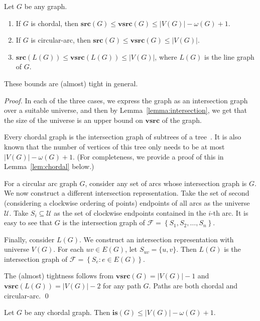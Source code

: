 \documentclass[letter,runningheads,envcountsame,envcountsect]{llncs}
\newcommand{\U}{\mathcal{U}}
\newcommand{\F}{\mathcal{F}}
\newcommand{\vsrc}{\mathbf{vsrc}}
\newcommand{\src}{\mathbf{src}}
\newcommand{\isn}{\mathbf{is}}
\begin{document}
\begin{corollary}
	\label{cor:chordal}
Let $G$ be any graph.
\begin{enumerate}
\item If $G$ is chordal, then $\src(G) \leq \vsrc(G) \leq |V(G)| - \omega(G) + 1$.
\item If $G$ is circular-arc, then $\src(G) \leq \vsrc(G) \leq |V(G)|$.
\item $\src(L(G)) \leq \vsrc(L(G)) \leq |V(G)|$, where $L(G)$ is the line graph of $G$.
\end{enumerate}
These bounds are (almost) tight in general.
\end{corollary}
\begin{proof}
	In each of the three cases, we express the graph as an intersection graph over a suitable universe, and then by Lemma~\ref{lemma:intersection}, we get that the size of the universe is an upper bound on $\vsrc$ of the graph.

	Every chordal graph is the intersection graph of subtrees of a tree~\cite{GAVRIL197447}. It is also known that the number of vertices of this tree only needs to be at most $|V(G)|-\omega(G)+1$.
	(For completeness, we provide a proof of this in Lemma~\ref{lem:chordal} below.)

For a circular arc graph $G$, consider any set of arcs whose intersection graph is $G$. We now construct a different intersection representation. Take the set of second (considering a clockwise ordering of points) endpoints of all arcs as the universe $\U$. Take $S_i\subseteq \U$ as the set of clockwise endpoints contained in the $i$-th arc. It is easy to see that $G$ is the intersection graph of $\F=\left\{ S_1,S_2,\dots, S_n \right\}$.

Finally, consider $L(G)$. We construct an intersection representation with universe $V(G)$. For each $uv \in E(G)$, let $S_{uv}=\{u,v\}$. Then $L(G)$ is the intersection graph of $\F=\left\{ S_e:e\in E(G) \right\}$.

The (almost) tightness follows from $\vsrc(G) = |V(G)|-1$ and $\vsrc(L(G)) = |V(G)|-2$ for any path $G$. Paths are both chordal and circular-arc.
\qed\end{proof}
\begin{lemma}\label{lem:chordal}
Let $G$ be any chordal graph. Then $\isn(G) \leq |V(G)| - \omega(G) + 1$.
\end{lemma}
\end{document}

